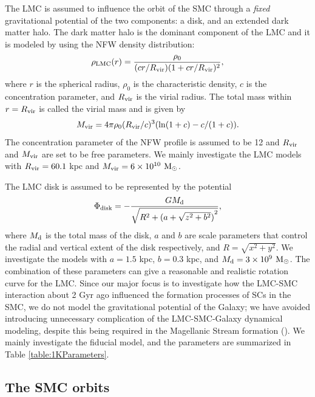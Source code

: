 \documentclass[fleqn,usenatbib]{mnras}
\begin{document}
The LMC is assumed to influence
the orbit of the SMC through a \emph{fixed} gravitational potential of the two components: a disk, and an extended dark matter halo.  
The dark matter halo is the dominant component of the LMC
and it is modeled by using the NFW density distribution:
\begin{equation}
{\rho}_{\rm LMC} (r)=\frac{\rho_{0}}{(cr/R_{\rm vir})(1+cr/R_{\rm vir})^2},
\end{equation}
where $r$ is the spherical radius, $\rho_{0}$ is the characteristic density, $c$ is the concentration parameter, and $R_{\rm vir}$ is the virial radius. The total mass within $r=R_{\rm vir}$ is called the virial mass and is given by
\begin{equation}
M_{\rm vir}=4\pi \rho_{0} (R_{\rm vir}/c)^3( \ln(1+c) - c/(1+c)).
\end{equation}
The concentration parameter of the NFW profile is assumed to be 12 and 
$R_{\rm vir}$ and $M_{\rm vir}$ are set to be free parameters.
We mainly investigate the LMC models
with 
$R_{\rm vir}=60.1$ kpc and $M_{\rm vir}=6 \times 10^{10}$ ${\rm M}_{\odot}$.


The LMC disk is assumed to be represented by the \cite{K17_Miyamoto_Nagai1975} potential
\begin{equation}
{\Phi}_{\rm disk}=-\frac{GM_{\rm d}}{\sqrt{R^2 +{(a+\sqrt{z^2+b^2})}^2}},
\end{equation}
where $M_{\rm d}$ is the total mass of the disk, 
$a$ and $b$ are scale parameters that 
control the radial and vertical extent of the disk  
respectively, and $R=\sqrt{x^2+y^2}$.
We investigate the models with $a=1.5$ kpc, $b=0.3$ kpc, and $M_{\rm d}=3 \times 10^{9}$ ${\rm M}_{\odot}$.
The combination of these parameters can give a reasonable and realistic
rotation curve for the LMC.
Since our major focus is to investigate how the LMC-SMC interaction about
2 Gyr ago influenced the formation processes of SCs in the SMC, we do not model the gravitational potential of the Galaxy; we have avoided introducing
unnecessary complication of the LMC-SMC-Galaxy dynamical modeling, despite this being required in the Magellanic Stream formation (\citealt{K3_Diaz_Bekki2012}). We mainly investigate the fiducial model, and the parameters are summarized in
Table \ref{table:1KParameters}.

\subsection{The SMC orbits}
\end{document}
